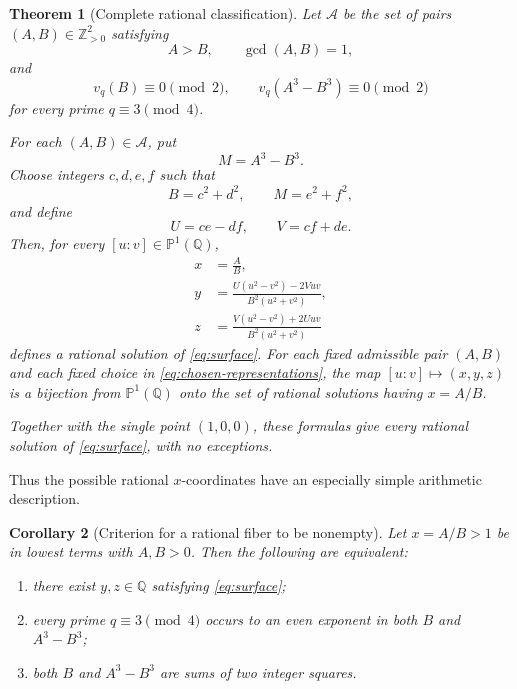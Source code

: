 \documentclass[11pt,a4paper]{article}
\numberwithin{equation}{section}
\newtheorem{theorem}{Theorem}[section]
\newtheorem{corollary}[theorem]{Corollary}
\theoremstyle{definition}
\theoremstyle{remark}
\newcommand{\Z}{\mathbb Z}
\newcommand{\Q}{\mathbb Q}
\newcommand{\PP}{\mathbb P}
\begin{document}
\begin{theorem}[Complete rational classification]
\label{thm:rational-main}
Let $\mathscr A$ be the set of pairs $(A,B)\in\Z_{>0}^2$ satisfying
\begin{equation}
 A>B,\qquad \gcd(A,B)=1,
 \label{eq:admissible-basic}
\end{equation}
and
\begin{equation}
 v_q(B)\equiv 0\pmod 2,
 \qquad
 v_q(A^3-B^3)\equiv 0\pmod 2
 \label{eq:admissible-valuations}
\end{equation}
for every prime $q\equiv 3\pmod 4$.

For each $(A,B)\in\mathscr A$, put
\[
 M=A^3-B^3.
\]
Choose integers $c,d,e,f$ such that
\begin{equation}
 B=c^2+d^2,
 \qquad
 M=e^2+f^2,
 \label{eq:chosen-representations}
\end{equation}
and define
\begin{equation}
 U=ce-df,
 \qquad
 V=cf+de.
 \label{eq:UV}
\end{equation}
Then, for every $[u:v]\in\PP^1(\Q)$,
\begin{align}
 x&=\frac AB,
 \label{eq:param-x}\\
 y&=\frac{U(u^2-v^2)-2Vuv}{B^2(u^2+v^2)},
 \label{eq:param-y}\\
 z&=\frac{V(u^2-v^2)+2Uuv}{B^2(u^2+v^2)}
 \label{eq:param-z}
\end{align}
defines a rational solution of \eqref{eq:surface}. For each fixed admissible pair $(A,B)$ and each fixed choice in \eqref{eq:chosen-representations}, the map $[u:v]\mapsto(x,y,z)$ is a bijection from $\PP^1(\Q)$ onto the set of rational solutions having $x=A/B$.

Together with the single point $(1,0,0)$, these formulas give every rational solution of \eqref{eq:surface}, with no exceptions.
\end{theorem}

Thus the possible rational $x$-coordinates have an especially simple arithmetic description.

\begin{corollary}[Criterion for a rational fiber to be nonempty]
\label{cor:x-criterion}
Let $x=A/B>1$ be in lowest terms with $A,B>0$. Then the following are equivalent:
\begin{enumerate}[label=\textup{(\roman*)}]
 \item there exist $y,z\in\Q$ satisfying \eqref{eq:surface};
 \item every prime $q\equiv3\pmod4$ occurs to an even exponent in both $B$ and $A^3-B^3$;
 \item both $B$ and $A^3-B^3$ are sums of two integer squares.
\end{enumerate}
\end{corollary}
\end{document}
